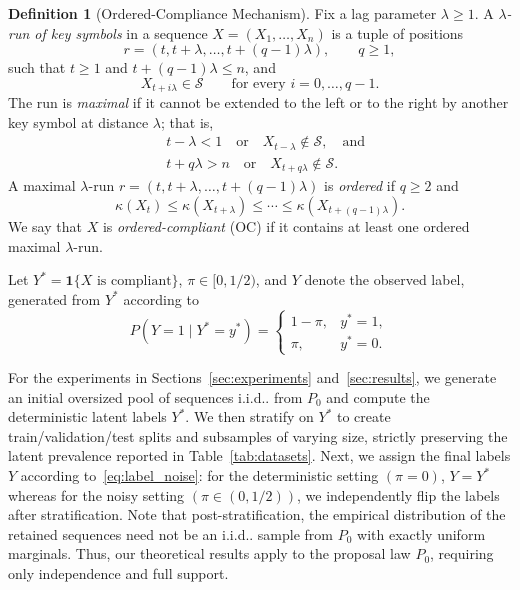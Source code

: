 \documentclass{article} %
\makeatletter
\def\@onedot{\ifx\@let@token.\else.\null\fi\xspace}
\def\onedot{\futurelet\@let@token\@onedot}
\def\iid{i.i.d\onedot} \def\wolog{w.l.o.g\onedot}
\theoremstyle{plain}
\theoremstyle{definition}
\newtheorem{definition}[theorem]{Definition}
\theoremstyle{remark}
\makeatother
\begin{document}
\begin{definition}[Ordered-Compliance Mechanism]
\label{def:compliance}
Fix a lag parameter $\lambda \geq 1$. A \emph{$\lambda$-run of key symbols}
in a sequence $X=(X_1,\ldots,X_n)$ is a tuple of positions
\[
r=(t,t+\lambda,\ldots,t+(q-1)\lambda),
\qquad q\geq 1,
\]
such that $t \geq 1$ and $t+(q-1)\lambda\leq n$, and
\[
X_{t+i\lambda}\in\mathcal{S}
\qquad
\text{for every } i=0,\ldots,q-1.
\]
The run is \emph{maximal} if it cannot be extended to the left or to the right
by another key symbol at distance $\lambda$; that is,
\[
\begin{aligned}
&t-\lambda < 1
\quad\text{or}\quad
X_{t-\lambda}\notin\mathcal{S},
\quad\text{and}\\
&t+q\lambda > n
\quad\text{or}\quad
X_{t+q\lambda}\notin\mathcal{S}.
\end{aligned}
\]
A maximal $\lambda$-run $r=(t,t+\lambda,\ldots,t+(q-1)\lambda)$ is
\emph{ordered} if $q\geq 2$ and
\[
\kappa(X_t)
\leq
\kappa(X_{t+\lambda})
\leq
\cdots
\leq
\kappa(X_{t+(q-1)\lambda}).
\]
We say that $X$ is \emph{ordered-compliant} (OC) if it contains at least one ordered
maximal $\lambda$-run.
\end{definition}

Let $Y^*=\mathbf{1}\{X \text{ is compliant}\}$, $\pi\in[0,1/2)$, and
$Y$ denote the observed label, generated from $Y^*$ according to
\begin{equation}
\label{eq:label_noise}
P(Y=1\mid Y^*=y^*)=
\begin{cases}
1-\pi, & y^*=1,\\
\pi, & y^*=0.
\end{cases}
\end{equation}

For the experiments in Sections~\ref{sec:experiments} and~\ref{sec:results}, we generate an initial oversized pool of sequences \iid from $P_0$ and compute the deterministic latent labels $Y^*$. We then stratify on $Y^*$ to create train/validation/test splits and subsamples of varying size, strictly preserving the latent prevalence reported in Table~\ref{tab:datasets}. Next, we assign the final labels $Y$ according to~\eqref{eq:label_noise}: for the deterministic setting $(\pi = 0)$, $Y = Y^*$ whereas for the noisy setting $(\pi \in (0, 1/2))$, we independently flip the labels after stratification. Note that post-stratification, the empirical distribution of the retained sequences need not be an \iid sample from $P_0$ with exactly uniform marginals. Thus, our theoretical results apply to the proposal law $P_0$, requiring only independence and full support.
\end{document}

